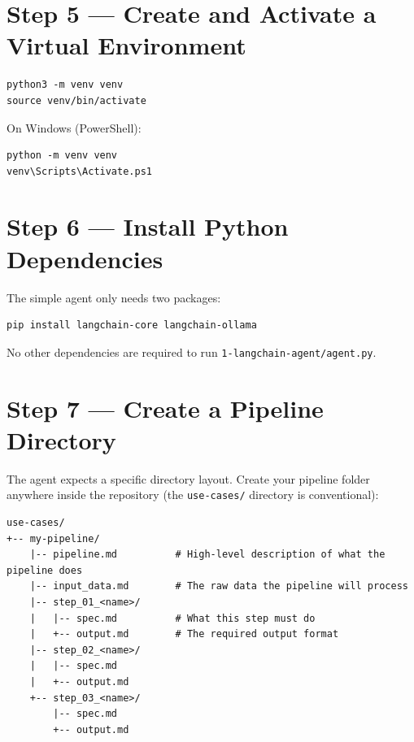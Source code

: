 \documentclass[12pt, a4paper]{article}
\begin{document}
\section{Step 5 — Create and Activate a Virtual Environment}

\begin{lstlisting}[style=shellstyle]
python3 -m venv venv
source venv/bin/activate
\end{lstlisting}

On Windows (PowerShell):

\begin{lstlisting}[style=shellstyle]
python -m venv venv
venv\Scripts\Activate.ps1
\end{lstlisting}

\section{Step 6 — Install Python Dependencies}

The simple agent only needs two packages:

\begin{lstlisting}[style=shellstyle]
pip install langchain-core langchain-ollama
\end{lstlisting}

No other dependencies are required to run \texttt{1-langchain-agent/agent.py}.

\section{Step 7 — Create a Pipeline Directory}

The agent expects a specific directory layout. Create your pipeline folder anywhere inside the repository (the \texttt{use-cases/} directory is conventional):

\begin{lstlisting}[language={}]
use-cases/
+-- my-pipeline/
    |-- pipeline.md          # High-level description of what the pipeline does
    |-- input_data.md        # The raw data the pipeline will process
    |-- step_01_<name>/
    |   |-- spec.md          # What this step must do
    |   +-- output.md        # The required output format
    |-- step_02_<name>/
    |   |-- spec.md
    |   +-- output.md
    +-- step_03_<name>/
        |-- spec.md
        +-- output.md
\end{lstlisting}
\end{document}
